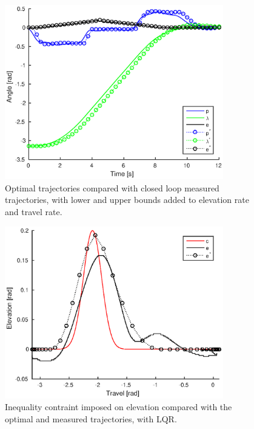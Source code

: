 \begin{figure}[hp]
	\centering
		\includegraphics[width=0.85\textwidth]{figures/4/closedloopConstrained25.eps}
	\caption{Optimal trajectories compared with closed loop measured trajectories, with lower and upper bounds added to elevation rate and travel rate.}
	\label{fig:closedloopConstrained25}
\end{figure}

\begin{figure}[hp]
	\centering
		\includegraphics[width=0.85\textwidth]{figures/4/closedloop25_cons.eps}
	\caption{Inequality contraint imposed on elevation compared with the optimal and measured trajectories, with LQR.}
	\label{fig:closedloop25_cons}
\end{figure}

